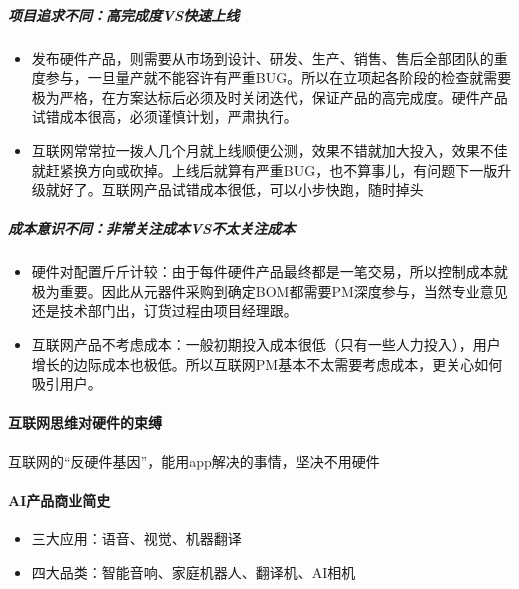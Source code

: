 \documentclass[letterpaper,11pt,english]{sphinxmanual}
\begin{document}
\subparagraph{项目追求不同：高完成度VS快速上线}
\label{\detokenize{chapter_project/AI_hardware:id4}}\begin{itemize}
\item {} 
发布硬件产品，则需要从市场到设计、研发、生产、销售、售后全部团队的重度参与，一旦量产就不能容许有严重BUG。所以在立项起各阶段的检查就需要极为严格，在方案达标后必须及时关闭迭代，保证产品的高完成度。硬件产品试错成本很高，必须谨慎计划，严肃执行。

\item {} 
互联网常常拉一拨人几个月就上线顺便公测，效果不错就加大投入，效果不佳就赶紧换方向或砍掉。上线后就算有严重BUG，也不算事儿，有问题下一版升级就好了。互联网产品试错成本很低，可以小步快跑，随时掉头

\end{itemize}


\subparagraph{成本意识不同：非常关注成本VS不太关注成本}
\label{\detokenize{chapter_project/AI_hardware:id5}}\begin{itemize}
\item {} 
硬件对配置斤斤计较：由于每件硬件产品最终都是一笔交易，所以控制成本就极为重要。因此从元器件采购到确定BOM都需要PM深度参与，当然专业意见还是技术部门出，订货过程由项目经理跟。

\item {} 
互联网产品不考虑成本：一般初期投入成本很低（只有一些人力投入），用户增长的边际成本也极低。所以互联网PM基本不太需要考虑成本，更关心如何吸引用户。

\end{itemize}


\paragraph{互联网思维对硬件的束缚}
\label{\detokenize{chapter_project/AI_hardware:id6}}
互联网的“反硬件基因”，能用app解决的事情，坚决不用硬件


\paragraph{AI产品商业简史}
\label{\detokenize{chapter_project/AI_hardware:ai}}\begin{itemize}
\item {} 
三大应用：语音、视觉、机器翻译

\item {} 
四大品类：智能音响、家庭机器人、翻译机、AI相机

\end{itemize}
\end{document}
